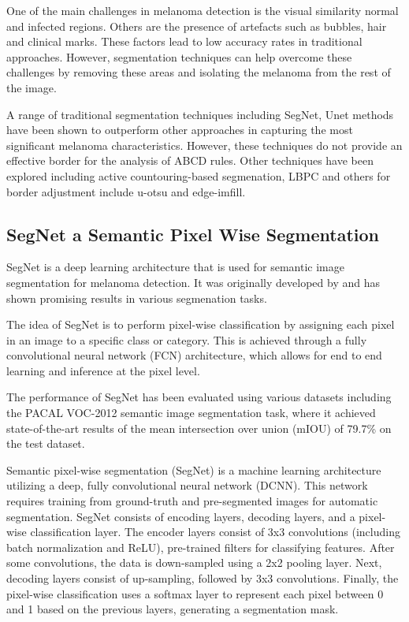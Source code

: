 One of the main challenges in melanoma detection is the visual similarity normal and infected regions. Others are the presence of artefacts such as bubbles, hair and clinical marks\cite{Albahli2020}. These factors lead to low accuracy rates in traditional approaches. However, segmentation techniques can help overcome these challenges by removing these areas and isolating the melanoma from the rest of the image.

A range of traditional segmentation techniques including SegNet, Unet methods have been shown to outperform other approaches in capturing the most significant melanoma characteristics. However, these techniques do not provide an effective border for the analysis of ABCD rules. Other techniques have been explored including active countouring-based segmenation\cite{Riaz2019}, LBPC and others for border adjustment include u-otsu and edge-imfill.


\subsection{SegNet a Semantic Pixel Wise Segmentation}
SegNet is a deep learning architecture that is used for semantic image segmentation for melanoma detection. It was originally developed by\cite{chen2018} and has shown promising results in various segmenation tasks.

The idea of SegNet is to perform pixel-wise classification by assigning each pixel in an image to a specific class or category. This is achieved through a fully convolutional neural network (FCN) architecture, which allows for end to end learning and inference at the pixel level. 

The performance of SegNet has been evaluated using various datasets including the PACAL VOC-2012 semantic image segmentation task, where it achieved state-of-the-art results of the mean intersection over union (mIOU) of 79.7\% on the test dataset.

Semantic pixel-wise segmentation (SegNet) is a machine learning architecture utilizing a deep, fully convolutional neural network (DCNN). This network requires training from ground-truth and pre-segmented images for automatic segmentation. SegNet consists of encoding layers, decoding layers, and a pixel-wise classification layer. The encoder layers consist of 3x3 convolutions (including batch normalization and ReLU), pre-trained filters for classifying features. After some convolutions, the data is down-sampled using a 2x2 pooling layer. Next, decoding layers consist of up-sampling, followed by 3x3 convolutions. Finally, the pixel-wise classification uses a softmax layer to represent each pixel between 0 and 1 based on the previous layers, generating a segmentation mask.

